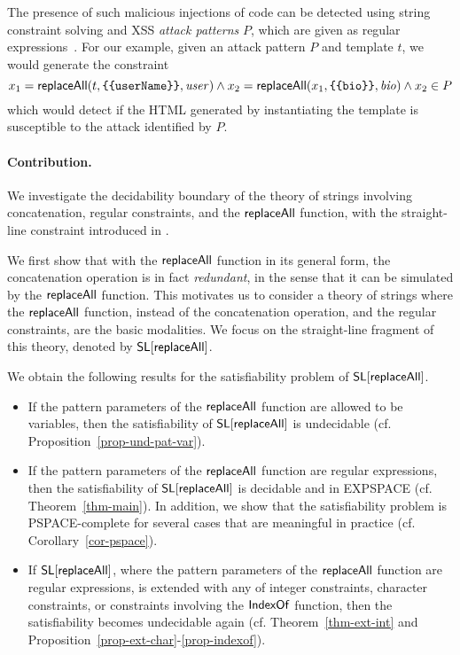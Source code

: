 The presence of such malicious injections of code can be detected using string constraint solving and XSS \emph{attack patterns} $P$, which are given as regular expressions~\cite{BCFJKKV08,SAHMMS10,YABI14}.
For our example, given an attack pattern $P$ and template $t$, we would generate the constraint
\[
    x_1 = \replaceall(t, \verb+{{userName}}+, \mathit{user})
    \land
    x_2 = \replaceall(x_1, \verb+{{bio}}+, \mathit{bio})
    \land
    x_2 \in P
\]
which would detect if the HTML generated by instantiating the template is susceptible to the attack identified by $P$.

\paragraph{Contribution.} We investigate the decidability boundary of the theory of strings involving concatenation, regular constraints, and the $\mathsf{replaceAll}$ function, with the straight-line constraint introduced in \cite{LB16}. 

We first show that with the $\mathsf{replaceAll}$ function in its general form, the concatenation operation is in fact \emph{redundant}, in the sense that it can be simulated by the $\mathsf{replaceAll}$ function. This motivates us to consider a theory of strings where the $\mathsf{replaceAll}$ function, instead of the concatenation operation, and the regular constraints, are the basic modalities. We focus on the straight-line fragment of this theory, denoted by $\mathsf{SL}[\mathsf{replaceAll}]$.

We obtain the following results for the satisfiability problem of $\mathsf{SL}[\mathsf{replaceAll}]$.
\begin{itemize}
\item If the pattern parameters of the $\mathsf{replaceAll}$ function are allowed to be variables, then the satisfiability of $\mathsf{SL}[\mathsf{replaceAll}]$ is undecidable (cf. Proposition~\ref{prop-und-pat-var}).
%
\item If the pattern parameters of the $\mathsf{replaceAll}$ function are regular expressions, then the satisfiability of $\mathsf{SL}[\mathsf{replaceAll}]$ is decidable and in EXPSPACE (cf. Theorem~\ref{thm-main}). In addition, we show that the satisfiability problem is PSPACE-complete for several cases that are meaningful in practice (cf. Corollary~\ref{cor-pspace}).
%
\item If $\mathsf{SL}[\mathsf{replaceAll}]$, where the pattern parameters of the $\mathsf{replaceAll}$ function are regular expressions, is extended with any of integer constraints, character constraints, or constraints involving the $\mathsf{IndexOf}$ function, then the satisfiability becomes undecidable again (cf. Theorem~\ref{thm-ext-int} and  Proposition~\ref{prop-ext-char}-\ref{prop-indexof}).
\end{itemize}


